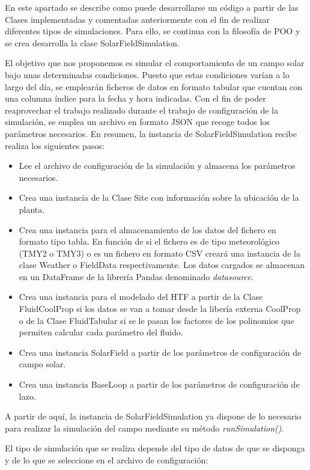 En este apartado se describe como puede desarrollarse un código a partir de las Clases implementadas y comentadas anteriormente con el fin de realizar diferentes tipos de simulaciones. Para ello, se continua con la filosofía de POO y se crea desarrolla la clase SolarFieldSimulation.

El objetivo que nos proponemos es simular el comportamiento de un campo solar bajo unas determinadas condiciones. Puesto que estas condiciones varían a lo largo del día, se emplearán ficheros de datos en formato tabular que cuentan con una columna índice para la fecha y hora indicadas. Con el fin de poder reaprovechar el trabajo realizado durante el trabajo de configuración de la simulación, se emplea un archivo en formato JSON que recoge todos los parámetros necesarios. En resumen, la instancia de SolarFieldSimulation recibe realiza los siguientes pasos:

\begin{itemize}
\item
  Lee el archivo de configuración de la simulación y almacena los   parámetros necesarios.
\item
  Crea una instancia de la Clase Site con información sobre la ubicación   de la planta.
\item
  Crea una instancia para el almacenamiento de los datos del fichero en   formato tipo tabla. En función de si el fichero es de tipo   meteorológico (TMY2 o TMY3) o es un fichero en formato CSV creará una   instancia de la clase Weather o FieldData respectivamente. Los datos   cargados se almacenan en un DataFrame de la librería Pandas denominado  \emph{datasource}.
\item
  Crea una instancia para el modelado del HTF a partir de la Clase   FluidCoolProp si los datos se van a tomar desde la libería externa   CoolProp o de la Clase FluidTabular si se le pasan los factores de los   polinomios que permiten calcular cada parámetro del fluido.
\item
  Crea una instancia SolarField a partir de los parámetros de   configuración de campo solar.
\item
  Crea una instancia BaseLoop a partir de los parámetros de   configuración de lazo.
\end{itemize}

A partir de aquí, la instancia de SolarFieldSimulation ya dispone de lo necesario para realizar la simulación del campo mediante su método \emph{runSimulation()}.

El tipo de simulación que se realiza depende del tipo de datos de que se disponga y de lo que se seleccione en el archivo de configuración:


